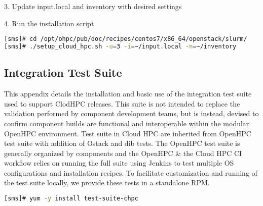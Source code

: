3. Update input.local and inventory with desired settings

4. Run the installation script

\begin{lstlisting}[language=bash,keywords={},upquote=true]
[sms]# cd /opt/ohpc/pub/doc/recipes/centos7/x86_64/openstack/slurm/
[sms]# ./setup_cloud_hpc.sh -u=3 -i=~/input.local -n=~/inventory
\end{lstlisting}


\newpage
\subsection{Integration Test Suite}
	

This appendix details the installation and basic use of the integration test suite used to support ClodHPC releases. This suite is not intended to replace the validation performed by component development teams, but is instead, devised to confirm component builds are functional and interoperable within the modular OpenHPC environment. Test suite in Cloud HPC are inherited from OpenHPC test suite with addition of Ostack and dib tests. The OpenHPC test suite is generally organized by components and the OpenHPC \& the Cloud HPC CI workflow relies on running the full suite using Jenkins to test multiple OS configurations and installation recipes. To facilitate customization and running of the test suite locally, we provide these tests in a standalone RPM.
\begin{lstlisting}[language=bash,keywords={},upquote=true]
[sms]# yum -y install test-suite-chpc
\end{lstlisting}

